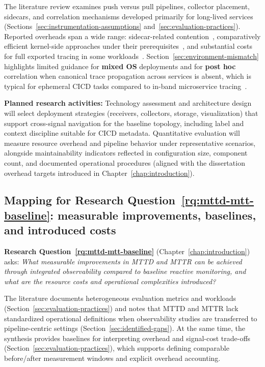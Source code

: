 The literature review examines push versus pull pipelines, collector placement, sidecars, and correlation mechanisms developed primarily for long-lived services (Sections~\ref{sec:instrumentation-assumptions} and~\ref{sec:evaluation-practices}). Reported overheads span a wide range: sidecar-related contention~\parencite{sahuSidecarsCentralLane2023}, comparatively efficient kernel-side approaches under their prerequisites~\parencite{sharmaEBPFEnhancedCompleteObservability2024}, and substantial costs for full exported tracing in some workloads~\parencite{InvestigatingPerformanceOverhead}. Section~\ref{sec:environment-mismatch} highlights limited guidance for \textbf{mixed OS} deployments and for \textbf{post hoc} correlation when canonical trace propagation across services is absent, which is typical for ephemeral \ac{CICD} tasks compared to in-band microservice tracing~\cite{sigelman2010dapper}.

\textbf{Planned research activities:} Technology assessment and architecture design will select deployment strategies (receivers, collectors, storage, visualization) that support cross-signal navigation for the baseline topology, including label and context discipline suitable for \ac{CICD} metadata. Quantitative evaluation will measure resource overhead and pipeline behavior under representative scenarios, alongside maintainability indicators reflected in configuration size, component count, and documented operational procedures (aligned with the dissertation overhead targets introduced in Chapter~\ref{chap:introduction}).

\subsection{\texorpdfstring{Mapping for Research Question~\ref{rq:mttd-mtt-baseline}: measurable improvements, baselines, and introduced costs}{Mapping for Research Question 3: measurable improvements, baselines, and introduced costs}}
\label{sec:rq3-mapping}

\textbf{Research Question~\ref{rq:mttd-mtt-baseline}} (Chapter~\ref{chap:introduction}) asks: \textit{What measurable improvements in \ac{MTTD} and \ac{MTTR} can be achieved through integrated observability compared to baseline reactive monitoring, and what are the resource costs and operational complexities introduced?}

The literature documents heterogeneous evaluation metrics and workloads (Section~\ref{sec:evaluation-practices}) and notes that \gls{MTTD} and \gls{MTTR} lack standardized operational definitions when observability studies are transferred to pipeline-centric settings (Section~\ref{sec:identified-gaps}). At the same time, the synthesis provides baselines for interpreting overhead and signal-cost trade-offs (Section~\ref{sec:evaluation-practices}), which supports defining comparable before/after measurement windows and explicit overhead accounting.

